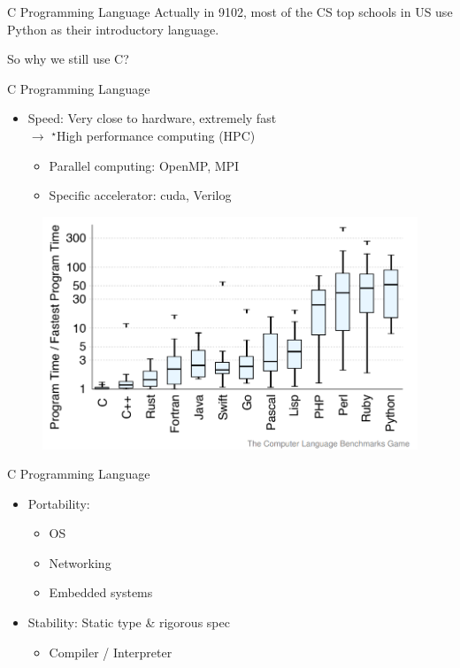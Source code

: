 \documentclass{../TexTemplate/myslide}
\begin{document}
\begin{frame}{C Programming Language}
Actually in 9102, most of the CS top schools in US use Python as their introductory language.
\pause
\bigskip
\begin{center}
\large So why we still use C?
\end{center}
\end{frame}

\begin{frame}{C Programming Language}
\begin{itemize}
	\item Speed: Very close to hardware, extremely fast\\
	$\to$ $^\star$High performance computing (HPC)
	\begin{itemize}
		\item Parallel computing: OpenMP, MPI
		\item Specific accelerator: cuda, Verilog
	\end{itemize}
\end{itemize}
\begin{figure}
\centering
\includegraphics[width=0.6\linewidth]{fig/running_time.png}
\end{figure}
\end{frame}

\begin{frame}{C Programming Language}
\begin{itemize}
	\item Portability:
	\begin{itemize}
		\item OS
		\item Networking
		\item Embedded systems
	\end{itemize}
	\item Stability: Static type \& rigorous spec
	\begin{itemize}
		\item Compiler / Interpreter
	\end{itemize}
\end{itemize}
\end{frame}
\end{document}
